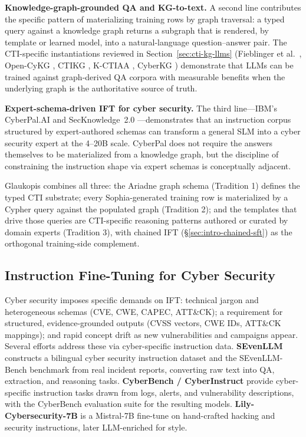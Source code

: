 \documentclass[webpdf,contemporary,large]{oup-authoring-template}
\theoremstyle{thmstyleone}
\theoremstyle{thmstyletwo}
\theoremstyle{thmstylethree}
\begin{document}
\textbf{Knowledge-graph-grounded QA and KG-to-text.} A second line contributes the specific pattern of materializing training rows by graph traversal: a typed query against a knowledge graph returns a subgraph that is rendered, by template or learned model, into a natural-language question--answer pair. The CTI-specific instantiations reviewed in Section~\ref{sec:cti-kg-llms} (Fieblinger et al.\ \cite{fieblinger2024kg}, Open-CyKG \cite{wu2022opencykg}, CTIKG \cite{yu2024ctikg}, K-CTIAA \cite{zhao2024kctiaa}, CyberKG \cite{zhang2023cyberkg}) demonstrate that LLMs can be trained against graph-derived QA corpora with measurable benefits when the underlying graph is the authoritative source of truth.

\textbf{Expert-schema-driven IFT for cyber security.} The third line---IBM's CyberPal.AI \cite{levi2024cyberpal} and SecKnowledge~2.0 \cite{levi2025toward}---demonstrates that an instruction corpus structured by expert-authored schemas can transform a general SLM into a cyber security expert at the 4--20B scale. CyberPal does not require the answers themselves to be materialized from a knowledge graph, but the discipline of constraining the instruction shape via expert schemas is conceptually adjacent.

Glaukopis combines all three: the Ariadne graph schema (Tradition 1) defines the typed CTI substrate; every Sophia-generated training row is materialized by a Cypher query against the populated graph (Tradition 2); and the templates that drive those queries are CTI-specific reasoning patterns authored or curated by domain experts (Tradition 3), with chained IFT (\S\ref{sec:intro-chained-sft}) as the orthogonal training-side complement.

\subsection{Instruction Fine-Tuning for Cyber Security}
\label{sec:ift-cyber}

Cyber security imposes specific demands on IFT: technical jargon and heterogeneous schemas (CVE, CWE, CAPEC, ATT\&CK); a requirement for structured, evidence-grounded outputs (CVSS vectors, CWE IDs, ATT\&CK mappings); and rapid concept drift as new vulnerabilities and campaigns appear. Several efforts address these via cyber-specific instruction data. \textbf{SEvenLLM} \cite{ji2024sevenllm} constructs a bilingual cyber security instruction dataset and the SEvenLLM-Bench benchmark from real incident reports, converting raw text into QA, extraction, and reasoning tasks. \textbf{CyberBench / CyberInstruct} \cite{liu2024cyberbench} provide cyber-specific instruction tasks drawn from logs, alerts, and vulnerability descriptions, with the CyberBench evaluation suite for the resulting models. \textbf{Lily-Cybersecurity-7B} \cite{liu2024cyberbench} is a Mistral-7B fine-tune on hand-crafted hacking and security instructions, later LLM-enriched for style.
\end{document}
